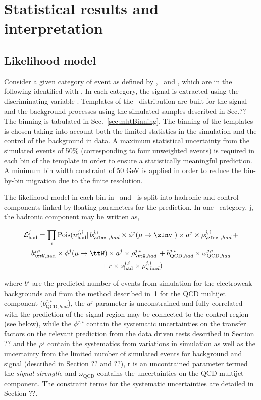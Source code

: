 \chapter{Statistical results and interpretation}
\section{Likelihood model}
\label{sec:likelihood}

Consider a given category of event as defined by \njet, \nb~and \scalht, which are in the following identified with \htcat. 
In each category, the signal is extracted using the discriminating variable \mht. 
Templates of the \mht~distribution are built for the signal and the background processes 
using the simulated samples described in Sec.?? The \mht binning is tabulated in Sec.~\ref{sec:mhtBinning}.
The binning of the templates is chosen taking into account both the limited statistics in the simulation and 
the control of the background in data. 
A maximum statistical uncertainty from the simulated events of 50\% (corresponding to four unweighted events) 
is required in each bin of the template in order to ensure a statistically meaningful prediction. 
A minimum bin width constraint of 50 GeV is applied in order to reduce the bin-by-bin migration 
due to the finite \mht resolution.

The likelihood model in each bin in \mht~and \htcat~is split into hadronic and control components linked
by floating parameters for the prediction. In one \htcat~category, j, the hadronic component may be written as,

\begin{multline}
\label{eq:hadronicLikelihood}
\mathcal{L}^{j}_{\mathrm{had}} = \prod_i \mathrm{Pois}(n^{j,i}_{\mathrm{had}} |\, b^{j,i}_{\zInv~,had}\times\phi^{j}(\mu\rightarrow\zInv~)\times a^{j}\times\rho^{j,i}_{\zInv~,had}\, + \\ 
b^{j,i}_{\ttW,\mathrm{had}}\times\phi^{j}(\mu\rightarrow\ttW)\times a^{j}\times\rho^{j,i}_{\ttW,had}\, + b^{j,i}_{\text{QCD},had}\times\omega^{j,i}_{\text{QCD},had}\\\
+ \,r\times s^{j,i}_{\mathrm{had}}\times\rho^{j,i}_{s,had}) 
\end{multline}

where $b^{j}$ are the predicted number of events from simulation for the electroweak
backgrounds and from the method described in~\ref{} for the QCD multijet component ($b^{j,i}_{\text{QCD},had}$), 
the $a^{j}$ parameter is unconstrained and fully correlated with the prediction of the signal region may be connected 
to the control region (see below), while the $\phi^{j,i}$ contain the systematic uncertainties on the 
transfer factors on the relevant prediction from the data driven tests described in Section ?? and the 
$\rho^{j}$ contain the systematics from variations in simulation as well as the uncertainty from the limited number of 
simulated events for background and signal (described in Section ?? and ??), r is an uncontrained parameter 
termed the \emph{signal strength}, and $\omega_{\text{QCD}}$ contains the uncertainties on the QCD multijet component. 
The constraint terms for the systematic uncertainties are detailed in Section ??.

